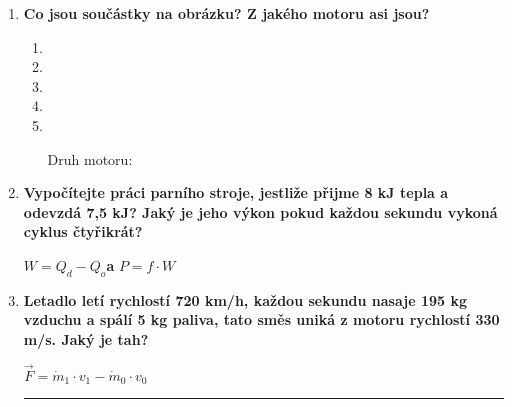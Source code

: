 \documentclass[../main.tex]{subfiles}
\begin{document}
\begin{enumerate}[label={\textbf{\arabic*.}}, resume]

    \item \textbf{Co jsou součástky na obrázku? Z jakého motoru asi jsou?}
        \begin{enumerate}[label={\arabic*.}, wide=0pt]
            \item \tecky{5.3cm}
            \item \tecky{5.3cm}
            \item \tecky{5.3cm}
            \item \tecky{5.3cm}
            \item \tecky{5.3cm}
            \item[Druh motoru:]\tecky{3cm}
        \end{enumerate}
    
    \item \textbf{Vypočítejte práci parního stroje, jestliže přijme 8 kJ tepla a odevzdá 7,5 kJ? Jaký je jeho výkon pokud každou sekundu vykoná cyklus čtyřikrát?}
    \vspace{-0.75cm}
    \begin{flushright}
        \begin{minipage}{0.32\textwidth}
            \begin{tcolorbox}[colframe=black, colback=white, boxrule=0.6pt]
                {\(W=Q_d-Q_o\)\hspace{0.25cm}\textbf{a}\hspace{0.25cm}  \(P=f\cdot{W}\)}
            \end{tcolorbox}
        \end{minipage}
    \end{flushright}
    \vspace{6cm}

    \item \textbf{Letadlo letí rychlostí 720 km/h, každou sekundu nasaje 195 kg vzduchu a spálí 5 kg paliva, tato směs uniká z motoru rychlostí 330 m/s. Jaký je tah?}
    \vspace{-0.75cm}
    \begin{flushright}
        \begin{minipage}{0.25\textwidth}
            \begin{tcolorbox}[colframe=black, colback=white, boxrule=0.6pt]
                {\(\vec{F}=\dot{m}_{1}\cdot{v_1}-\dot{m}_{0}\cdot{v_0}\)}
            \end{tcolorbox}
        \end{minipage}
    \end{flushright}
    \vspace{6cm}

    \hrule
\end{enumerate}
\end{document}
